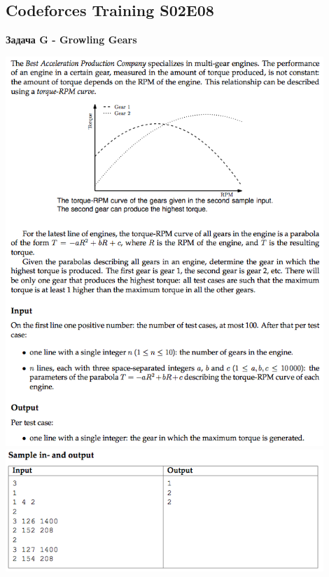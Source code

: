 \documentclass[a4paper,12pt]{article}
\begin{document}
%
%
\newpage
\subsection{Codeforces Training S02E08}

\textbf{{\large Задача G - Growling Gears}} \\
\begin{center}
\includegraphics[width=0.9\textwidth]{CT_S02E08/CT_S02E08_G1.png}\\ [1cm]
\includegraphics[width=0.9\textwidth]{CT_S02E08/CT_S02E08_G2.png}\\ [1cm]
\end{center}
\end{document}
